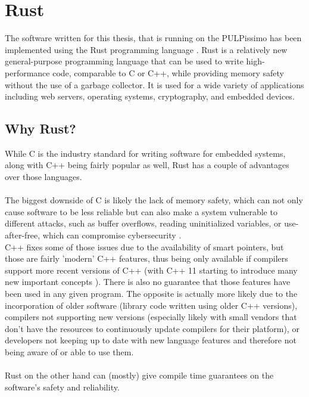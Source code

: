 \section{Rust}

The software written for this thesis, that is running on the PULPissimo \cite{pulpissimo} has been implemented using the Rust programming language \cite{rustlang}.
Rust is a relatively new general-purpose programming language that can be used to write high-performance code, comparable
to C or C++, while providing memory safety without the use of a garbage collector.
It is used for a wide variety of applications including web servers, operating systems, cryptography, and embedded devices.

\subsection{Why Rust?}

While C is the industry standard for writing software for embedded systems, along with C++ being fairly popular as well, Rust has a couple of
advantages over those languages.\\\\
The biggest downside of C is likely the lack of memory safety, which can not only cause software to be less reliable but
can also make a system vulnerable to different attacks, such as buffer overflows, reading uninitialized variables, or use-after-free, which can compromise cybersecurity \cite{memory_safety}.\\
C++ fixes some of those issues due to the availability of smart pointers, but those are fairly 'modern' C++ features, thus being only available if compilers support more recent
versions of C++ (with C++ 11 starting to introduce many new important concepts \cite{cpp11}).
There is also no guarantee that those features have been used in any given program.
The opposite is actually more likely due to the incorporation of older software (library code written using older C++ versions),
compilers not supporting new versions (especially likely with small vendors that don't have the resources to continuously update compilers for their platform),
or developers not keeping up to date with new language features and therefore not being aware of or able to use them.\\\\
Rust on the other hand can (mostly) give compile time guarantees on the software's safety and reliability.

